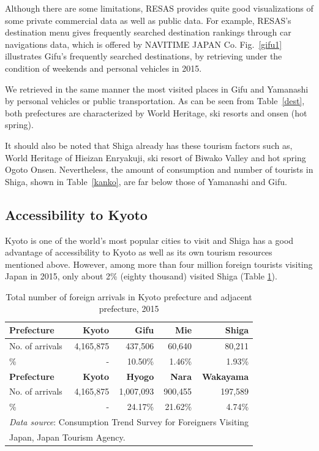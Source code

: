 \documentclass[10pt, conference, compsocconf]{IEEEtran}
\begin{document}
Although there are some limitations, RESAS provides quite good visualizations of some private commercial data as well as public data. For example, RESAS's destination menu gives frequently searched destination rankings through car navigations data, which is offered by NAVITIME JAPAN Co. Fig.~\ref{gifu1} illustrates Gifu's frequently searched destinations, by retrieving under the condition of weekends and personal vehicles in 2015. 


We retrieved in the same manner the most visited places in Gifu and Yamanashi by personal vehicles or public transportation.
As can be seen from Table~\ref{dest}, 
both prefectures are characterized by World Heritage, ski resorts and onsen (hot spring). 

It should also be noted that Shiga already has these tourism factors such as, 
World Heritage of Hieizan Enryakuji, ski resort of Biwako Valley and hot spring Ogoto Onsen.
Nevertheless, the amount of consumption and number of tourists in Shiga, shown in Table~\ref{kanko}, are far below those of Yamanashi and Gifu.


\subsection{Accessibility to Kyoto}


Kyoto is one of the world's most popular cities to visit and Shiga has a good advantage of accessibility to Kyoto as well as its own tourism resources mentioned above.
However, among more than four million foreign tourists visiting Japan in 2015, only about 2\% (eighty thousand) visited Shiga (Table \ref{percent}).

\begin{table}[!h]\caption{Total number of foreign arrivals in Kyoto prefecture and adjacent prefecture, 2015}
\label{percent}
\centering
\begin{tabular}{l|r|rrr}
\hline
\bf Prefecture & \bf Kyoto  & \bf Gifu  & \bf Mie  & \bf Shiga  \\\hline
No. of arrivals & 4,165,875 & 437,506 & 60,640 & 80,211\\
\% & - & 10.50\% & 1.46\% & 1.93\% \\\hline
\bf Prefecture & \bf Kyoto & \bf Hyogo  & \bf Nara  & \bf Wakayama  \\\hline
No. of arrivals & 4,165,875 & 1,007,093 & 900,455 & 197,589 \\
\% & - & 24.17\% & 21.62\% & 4.74\% \\\hline
\multicolumn{5}{l}{{\it Data source}: Consumption Trend Survey for Foreigners Visiting}\\
\multicolumn{5}{l}{Japan, Japan Tourism Agency.}
\end{tabular}
\end{table}
\end{document}
